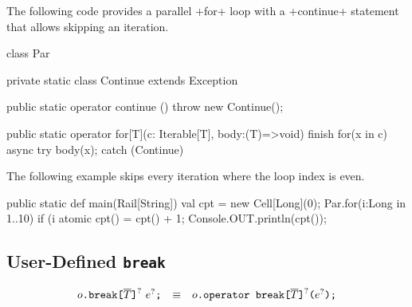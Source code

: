 \begin{ex}
  The following code provides a parallel \xcd+for+ loop with a
  \xcd+continue+ statement that allows skipping an iteration.
\begin{xten}
class Par {
  private static class Continue extends Exception {}

  public static operator continue () {
    throw new Continue();
  }

  public static operator for[T](c: Iterable[T], body:(T)=>void) {
    finish {
      for(x in c) async {
          try {
            body(x);
          } catch (Continue) {}
        }
    }
  }
}
\end{xten}
%
  The following example skips every iteration where the loop index is
  even.
\begin{xten}
public static def main(Rail[String]) {
  val cpt = new Cell[Long](0);
  Par.for(i:Long in 1..10) {
    if (i%
    atomic { cpt() = cpt() + 1; }
  }
  Console.OUT.println(cpt());
}
\end{xten}
\end{ex}


\subsection{User-Defined \texttt{break}}

$$
\begin{array}{rcl}
  {o}\texttt{.break}\texttt{[}{\overline{T}}\texttt{]}^?~{e}^?\texttt{;}
  & \equiv &
  {o}\texttt{.operator break}\texttt{[}{\overline{T}}\texttt{]}^?\texttt{(}{e}^?\texttt{);}
\end{array}
$$

